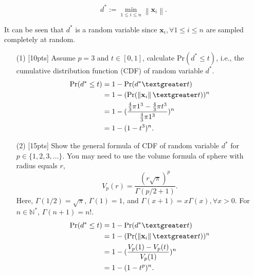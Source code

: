 \documentclass{article}
\begin{document}
\begin{equation}
d^{*} :=\min _{1 \leq i \leq n}\left\|\mathbf{x}_{i}\right\|.
\end{equation}
	
It can be seen that $d^*$ is a random variable since $\mathbf{x}_i, \forall 1 \leq i \leq n$ are sampled completely at random.	
	
	\begin{enumerate}
		\item [(1)] [10pts] Assume $ p = 3$ and $ t \in [0, 1]$, calculate Pr$(d^* \leq t)$, i.e., the cumulative distribution function (CDF) of random variable $d^*$.
        \begin{equation}
            \begin{aligned}
                \operatorname{Pr}(d^* \leq t) &= 1-\operatorname{Pr}(d^* \textgreater t)\\
                                              &= 1-(\operatorname{Pr}(\left\|\mathbf{x}_{i}\right\| \textgreater t))^n\\
                                              &= 1-(\frac{\frac{4}{3} \pi 1^3 - \frac{4}{3} \pi t^3}{\frac{4}{3} \pi 1^3})^n\\
                                              &= 1-(1-t^3)^n.
            \end{aligned}
        \end{equation}
        
        \item [(2)] [15pts] Show the general formula of CDF of random variable $d^*$ for $p \in \{1, 2, 3, \dots \}$. You may need to use the volume formula of sphere with radius equals $r$,
				\begin{equation}
				V_{p}(r)=\frac{(r \sqrt{\pi})^{p}}{\Gamma(p / 2+1)}.
				\end{equation}
				Here, $\Gamma(1 / 2)=\sqrt{\pi}$, $\Gamma(1)=1$, and $\Gamma(x+1)=x \Gamma(x), \forall x > 0$. For $n \in \mathbb{N}^*$, $\Gamma(n+1)=n!$.
                \begin{equation}
                    \begin{aligned}
                        \operatorname{Pr}(d^* \leq t) &= 1-\operatorname{Pr}(d^* \textgreater t)\\
                                                      &= 1-(\operatorname{Pr}(\left\|\mathbf{x}_{i}\right\| \textgreater t))^n\\
                                                      &= 1-(\frac{V_p(1) - V_p(t)}{V_p(1)})^n\\
                                                      &= 1-(1-t^p)^n.
                    \end{aligned}
                \end{equation}
        

\end{enumerate}
\end{document}
